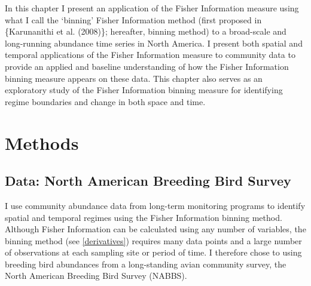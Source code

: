 \documentclass[12pt,twoside,openany]{reedthesis}
\begin{document}
In this chapter I present an application of the Fisher Information
measure using what I call the `binning' Fisher Information method (first
proposed in \{Karunanithi et al. (2008)\}; hereafter, binning method) to
a broad-scale and long-running abundance time series in North America. I
present both spatial and temporal applications of the Fisher Information
measure to community data to provide an applied and baseline
understanding of how the Fisher Information binning measure appears on
these data. This chapter also serves as an exploratory study of the
Fisher Information binning measure for identifying regime boundaries and
change in both space and time.

\section{Methods}\label{methods-1}

\subsection{Data: North American Breeding Bird
Survey}\label{data-north-american-breeding-bird-survey}

I use community abundance data from long-term monitoring programs to
identify spatial and temporal regimes using the Fisher Information
binning method. Although Fisher Information can be calculated using any
number of variables, the binning method (see \ref{derivatives}) requires
many data points and a large number of observations at each sampling
site or period of time. I therefore chose to using breeding bird
abundances from a long-standing avian community survey, the North
American Breeding Bird Survey (NABBS).
\end{document}
